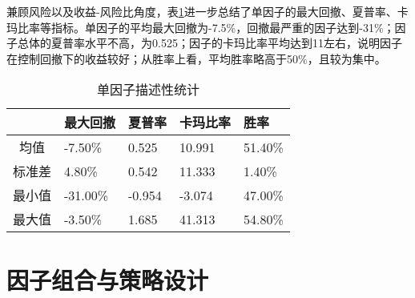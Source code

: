 \documentclass[11pt]{article}
\begin{document}
兼顾风险以及收益-风险比角度，表\ref{tab: describe}进一步总结了单因子的最大回撤、夏普率、卡玛比率等指标。单因子的平均最大回撤为-7.5\%，回撤最严重的因子达到-31\%；因子总体的夏普率水平不高，为0.525；因子的卡玛比率平均达到11左右，说明因子在控制回撤下的收益较好；从胜率上看，平均胜率略高于50\%，且较为集中。


\begin{table}[H]
\centering
\caption{单因子描述性统计}
\label{tab: describe}
\begin{tabular}{cllll}
\toprule
& 最大回撤     & 夏普率    & 卡玛比率   & 胜率      \\ \midrule
均值  & -7.50\%  & 0.525  & 10.991 & 51.40\% \\
标准差 & 4.80\%   & 0.542  & 11.333 & 1.40\%  \\
最小值 & -31.00\% & -0.954 & -3.074 & 47.00\% \\
最大值 & -3.50\%  & 1.685  & 41.313 & 54.80\% \\ \bottomrule
\end{tabular}
\end{table}

\section{因子组合与策略设计}
\end{document}
